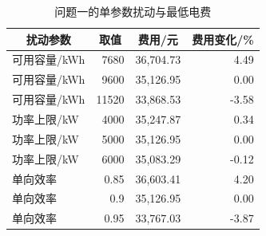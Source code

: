 \par
\begin{table}[!htbp]
\centering
\caption{问题一的单参数扰动与最低电费}\label{tab:q1-sensitivity}
\normalsize
\begin{tabular}{lrrr}
\toprule
\multicolumn{1}{c}{扰动参数} & \multicolumn{1}{c}{取值} & \multicolumn{1}{c}{费用/元} & \multicolumn{1}{c}{费用变化/\%} \\
\midrule
可用容量/kWh & 7680 & 36,704.73 & 4.49 \\
可用容量/kWh & 9600 & 35,126.95 & 0.00 \\
可用容量/kWh & 11520 & 33,868.53 & -3.58 \\
功率上限/kW & 4000 & 35,247.87 & 0.34 \\
功率上限/kW & 5000 & 35,126.95 & 0.00 \\
功率上限/kW & 6000 & 35,083.29 & -0.12 \\
单向效率 & 0.85 & 36,603.41 & 4.20 \\
单向效率 & 0.9 & 35,126.95 & 0.00 \\
单向效率 & 0.95 & 33,767.03 & -3.87 \\
\bottomrule
\end{tabular}
\end{table}
\par
